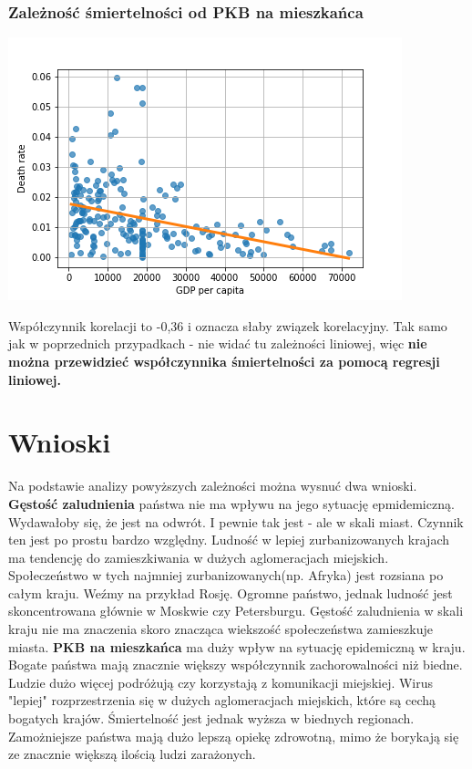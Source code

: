 \documentclass[10pt]{article}
\begin{document}
\subsubsection{Zależność śmiertelności od PKB na mieszkańca}
\begin{center}
\includegraphics[width=0.8\linewidth]{death_gdp.png}
\end{center}
Współczynnik korelacji to -0,36 i oznacza słaby związek korelacyjny. Tak samo jak w poprzednich przypadkach - nie widać tu zależności liniowej, więc \textbf{nie można przewidzieć współczynnika śmiertelności za pomocą regresji liniowej.}

\section{Wnioski}
Na podstawie analizy powyższych zależności można wysnuć dwa wnioski. 
\newline \textbf{Gęstość zaludnienia} państwa nie ma wpływu na jego sytuację epmidemiczną.
Wydawałoby się, że jest na odwrót. I pewnie tak jest - ale w skali miast. Czynnik ten jest po prostu bardzo względny. Ludność w lepiej zurbanizowanych krajach ma tendencję do zamieszkiwania w dużych aglomeracjach miejskich. Społeczeństwo w tych najmniej zurbanizowanych(np. Afryka) jest rozsiana po całym kraju. Weźmy na przykład Rosję. Ogromne państwo, jednak ludność jest skoncentrowana głównie w Moskwie czy Petersburgu. Gęstość zaludnienia w skali kraju nie ma znaczenia skoro znacząca wiekszość społeczeństwa zamieszkuje miasta. 
\newline \textbf{PKB na mieszkańca} ma duży wpływ na sytuację epidemiczną w kraju.
Bogate państwa mają znacznie większy współczynnik zachorowalności niż biedne. Ludzie dużo więcej podróżują czy korzystają z komunikacji miejskiej. Wirus "lepiej" rozprzestrzenia się w dużych aglomeracjach miejskich, które są cechą bogatych krajów. Śmiertelność jest jednak wyższa w biednych regionach. Zamożniejsze państwa mają dużo lepszą opiekę zdrowotną, mimo że borykają się ze znacznie większą ilością ludzi zarażonych.
\end{document}
